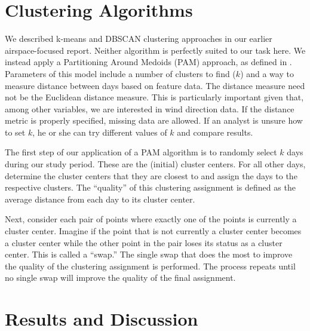 \documentclass[11pt]{scrartcl}
\begin{document}
\section{Clustering Algorithms}
We described k-means and DBSCAN clustering approaches in our earlier airspace-focused report.  Neither algorithm is perfectly suited to our task here.  We instead apply a Partitioning Around Medoids (PAM) approach, as defined in \cite{silhouette}.  Parameters of this model include a number of clusters to find ($k$) and a way to measure distance between days based on feature data.  The distance measure need not be the Euclidean distance measure.  This is particularly important given that, among other variables, we are interested in wind direction data.  If the distance metric is properly specified, missing data are allowed.  If an analyst is unsure how to set $k$, he or she can try different values of $k$ and compare results.

The first step of our application of a PAM algorithm is to randomly select $k$ days during our study period.  These are the (initial) cluster centers.  For all other days, determine the cluster centers that they are closest to and assign the days to the respective clusters.  The ``quality'' of this clustering assignment is defined as the average distance from each day to its cluster center.

Next, consider each pair of points where exactly one of the points is currently a cluster center.  Imagine if the point that is not currently a cluster center becomes a cluster center while the other point in the pair loses its status as a cluster center.  This is called a ``swap.''  The single swap that does the most to improve the quality of the clustering assignment is performed.  The process repeats until no single swap will improve the quality of the final assignment.
\newpage\noindent
\section{Results and Discussion}
\end{document}
